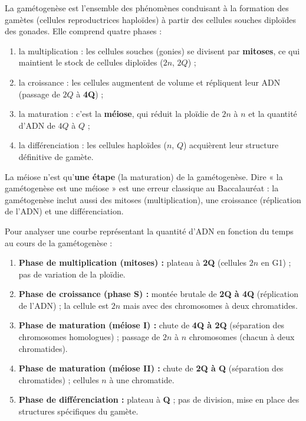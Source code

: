 \documentclass[11pt]{article}
\newcommand{\cle}[1]{{\popxbold\color{popdark}#1}}
\begin{document}
\begin{definition}[Gamétogenèse]
La \cle{gamétogenèse} est l'ensemble des phénomènes conduisant à la formation des \cle{gamètes} (cellules reproductrices haploïdes) à partir des cellules souches diploïdes des gonades. Elle comprend quatre phases :
\begin{enumerate}
\item la \cle{multiplication} : les cellules souches (gonies) se divisent par \textbf{mitoses}, ce qui maintient le stock de cellules diploïdes ($2n$, $2Q$) ;
\item la \cle{croissance} : les cellules augmentent de volume et répliquent leur ADN (passage de $2Q$ à \textbf{4Q}) ;
\item la \cle{maturation} : c'est la \textbf{méiose}, qui réduit la ploïdie de $2n$ à $n$ et la quantité d'ADN de $4Q$ à $Q$ ;
\item la \cle{différenciation} : les cellules haploïdes ($n$, $Q$) acquièrent leur structure définitive de gamète.
\end{enumerate}
\end{definition}

\begin{attention}
La méiose n'est qu'\textbf{une étape} (la maturation) de la gamétogenèse. Dire « la gamétogenèse est une méiose » est une erreur classique au Baccalauréat : la gamétogenèse inclut aussi des mitoses (multiplication), une croissance (réplication de l'ADN) et une différenciation.
\end{attention}

\begin{methode}
Pour analyser une courbe représentant la quantité d'ADN en fonction du temps au cours de la gamétogenèse :
\begin{enumerate}
\item \textbf{Phase de multiplication (mitoses) :} plateau à \textbf{2Q} (cellules $2n$ en G1) ; pas de variation de la ploïdie.
\item \textbf{Phase de croissance (phase S) :} montée brutale de \textbf{2Q à 4Q} (réplication de l'ADN) ; la cellule est $2n$ mais avec des chromosomes à deux chromatides.
\item \textbf{Phase de maturation (méiose I) :} chute de \textbf{4Q à 2Q} (séparation des chromosomes homologues) ; passage de $2n$ à $n$ chromosomes (chacun à deux chromatides).
\item \textbf{Phase de maturation (méiose II) :} chute de \textbf{2Q à Q} (séparation des chromatides) ; cellules $n$ à une chromatide.
\item \textbf{Phase de différenciation :} plateau à \textbf{Q} ; pas de division, mise en place des structures spécifiques du gamète.
\end{enumerate}
\end{methode}
\end{document}
